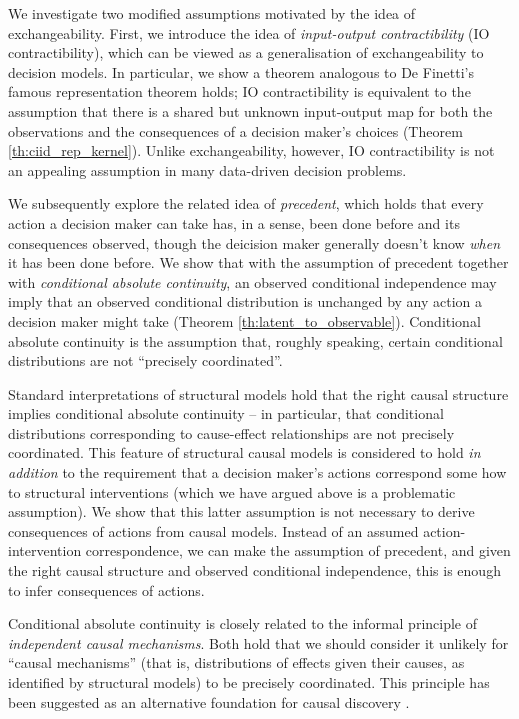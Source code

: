 \documentclass{article}
\begin{document}
We investigate two modified assumptions motivated by the idea of exchangeability. First, we introduce the idea of \emph{input-output contractibility} (IO contractibility), which can be viewed as a generalisation of exchangeability to decision models. In particular, we show a theorem analogous to De Finetti's famous representation \citep{de_finetti_foresight_1992} theorem holds; IO contractibility is equivalent to the assumption that there is a shared but unknown input-output map for both the observations and the consequences of a decision maker's choices (Theorem \ref{th:ciid_rep_kernel}). Unlike exchangeability, however, IO contractibility is not an appealing assumption in many data-driven decision problems.

We subsequently explore the related idea of \emph{precedent}, which holds that every action a decision maker can take has, in a sense, been done before and its consequences observed, though the deicision maker generally doesn't know \emph{when} it has been done before.  We show that with the assumption of precedent together with \emph{conditional absolute continuity}, an observed conditional independence may imply that an observed conditional distribution is unchanged by any action a decision maker might take (Theorem \ref{th:latent_to_observable}). Conditional absolute continuity is the assumption that, roughly speaking, certain conditional distributions are not ``precisely coordinated''.

Standard interpretations of structural models hold that the right causal structure implies conditional absolute continuity -- in particular, that conditional distributions corresponding to cause-effect relationships are not precisely coordinated. This feature of structural causal models is considered to hold \emph{in addition} to the requirement that a decision maker's actions correspond some how to structural interventions (which we have argued above is a problematic assumption). We show that this latter assumption is not necessary to derive consequences of actions from causal models. Instead of an assumed action-intervention correspondence, we can make the assumption of precedent, and given the right causal structure and observed conditional independence, this is enough to infer consequences of actions.

Conditional absolute continuity is closely related to the informal principle of \emph{independent causal mechanisms}. Both hold that we should consider it unlikely for ``causal mechanisms'' (that is, distributions of effects given their causes, as identified by structural models) to be precisely coordinated. This principle has been suggested as an alternative foundation for causal discovery \citep{lemeire_replacing_2013}.
\end{document}
